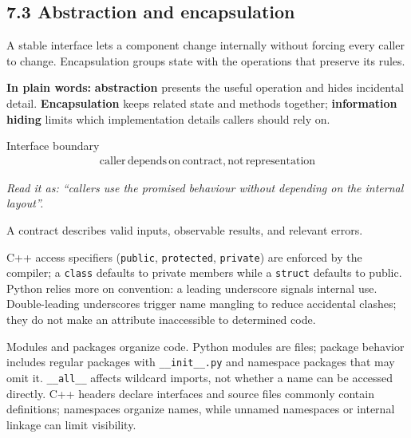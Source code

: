 \documentclass[11pt]{article}
\begin{document}
\begin{keepsection}
\section{7.3 Abstraction and encapsulation}

A stable interface lets a component change internally without forcing every caller to change. Encapsulation groups state with the operations that preserve its rules.

\begin{plainbox}\textbf{In plain words:} \textbf{abstraction} presents the useful operation and hides incidental detail. \textbf{Encapsulation} keeps related state and methods together; \textbf{information hiding} limits which implementation details callers should rely on.\end{plainbox}

\begin{equationcard}{Interface boundary}
\[ \begin{gathered} \text{caller}\, \text{depends}\, \text{on}\, \text{contract},\, \text{not}\, \text{representation} \end{gathered} \]
{\small \emph{Read it as: “callers use the promised behaviour without depending on the internal layout”.}\par A contract describes valid inputs, observable results, and relevant errors.}
\end{equationcard}

C++ access specifiers (\texttt{public}, \texttt{protected}, \texttt{private}) are enforced by the compiler; a \texttt{class} defaults to private members while a \texttt{struct} defaults to public. Python relies more on convention: a leading underscore signals internal use. Double-leading underscores trigger name mangling to reduce accidental clashes; they do not make an attribute inaccessible to determined code.

Modules and packages organize code. Python modules are files; package behavior includes regular packages with \texttt{\_\_init\_\_.py} and namespace packages that may omit it. \texttt{\_\_all\_\_} affects wildcard imports, not whether a name can be accessed directly. C++ headers declare interfaces and source files commonly contain definitions; namespaces organize names, while unnamed namespaces or internal linkage can limit visibility.


\end{keepsection}
\end{document}
